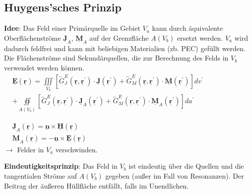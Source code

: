 \documentclass[english]{latex4ei/latex4ei_sheet}
\renewcommand{\vec}[1]{\underline{\boldsymbol{#1}}}
\begin{document}
\begin{sectionbox}
    \subsection{Huygens'sches Prinzip}
    \textbf{Idee}: Das Feld einer Primärquelle im Gebiet $V_a$ kann durch äquivalente Oberflächenströme $\vec{J}_A$, $\vec{M}_A$ auf der Grenzfläche $A(V_b)$ ersetzt werden. $V_a$ wird dadurch feldfrei und kann mit beliebigen Materialien (zb. PEC) gefüllt werden. Die Flächenströme sind Sekundärquellen, die zur Berechnung des Felds in $V_b$ verwendet werden können.\\
    $\begin{aligned}
             & \vec{E}(\vec{r})=\iiint\limits_{V_{b}}\left[\overleftrightarrow{G}_{J}^{E}\left(\vec{r}, \vec{r}^{\prime}\right) \cdot \vec{J}\left(\vec{r}^{\prime}\right)+\overleftrightarrow{G}_{M}^{E}\left(\vec{r}, \vec{r}^{\prime}\right) \cdot \vec{M}\left(\vec{r}^{\prime}\right)\right] d v^{\prime}       \\
             & +\oiint\limits_{A\left(V_{b}\right)}\left[\overleftrightarrow{G}_{J}^{E}\left(\vec{r}, \vec{r}^{\prime}\right) \cdot \vec{J}_{A}\left(\vec{r}^{\prime}\right)+\overleftrightarrow{G}_{M}^{E}\left(\vec{r}, \vec{r}^{\prime}\right) \cdot \vec{M}_{A}\left(\vec{r}^{\prime}\right)\right] d a^{\prime}
        \end{aligned}$\\
    \begin{emphbox}
        $\begin{aligned}
                 & \vec{J}_{A}\left(\vec{r}\right)=\vec{n} \times \vec{H}\left(\vec{r}\right)  \\
                 & \vec{M}_{A}\left(\vec{r}\right)=-\vec{n} \times \vec{E}\left(\vec{r}\right)
            \end{aligned}$\\
        $\rightarrow$ Felder in $V_a$ verschwinden.
    \end{emphbox}
    \textbf{Eindeutigkeitsprinzip}: Das Feld in $V_b$ ist eindeutig über die Quellen und die tangentialen Ströme auf $A(V_b)$ gegeben (außer im Fall von Resonanzen). Der Beitrag der äußeren Hüllfläche entfällt, falls im Unendlichen.\\


\end{sectionbox}
\end{document}
